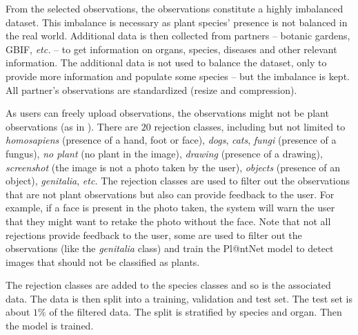 From the selected observations, the observations constitute a highly imbalanced dataset. This imbalance is necessary as plant species' presence is not balanced in the real world.
Additional data is then collected from partners -- botanic gardens, GBIF, \emph{etc.} -- to get information on organs, species, diseases and other relevant information.
The additional data is not used to balance the dataset, only to provide more information and populate some species -- but the imbalance is kept.
All partner's observations are standardized (resize and compression).

As users can freely upload observations, the observations might not be plant observations (as in ).
There are $20$ rejection classes, including but not limited to \emph{homosapiens} (presence of a hand, foot or face), \emph{dogs}, \emph{cats}, \emph{fungi} (presence of a fungus), \emph{no plant} (no plant in the image), \emph{drawing} (presence of a drawing), \emph{screenshot} (the image is not a photo taken by the user), \emph{objects} (presence of an object), \emph{genitalia}, \emph{etc.}
The rejection classes are used to filter out the observations that are not plant observations but also can provide feedback to the user.
For example, if a face is present in the photo taken, the system will warn the user that they might want to retake the photo without the face.
Note that not all rejections provide feedback to the user, some are used to filter out the observations (like the \emph{genitalia} class) and train the Pl@ntNet model to detect images that should not be classified as plants.

The rejection classes are added to the species classes and so is the associated data.
The data is then split into a training, validation and test set.
The test set is about $1\%$ of the filtered data.
The split is stratified by species and organ.
Then the model is trained.

